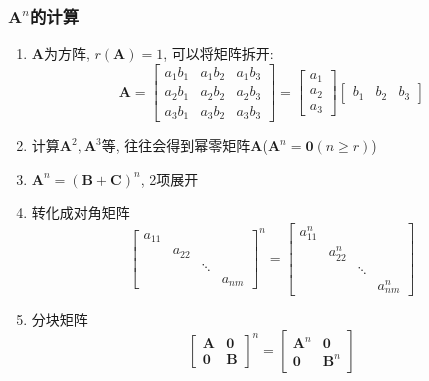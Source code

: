 \subsubsection{$ \bm{A}^{n} $的计算}
\begin{enumerate}
\item $ \bm{A} $为方阵, $ r(\bm{A})=1 $, 可以将矩阵拆开:
\begin{equation*}
\bm{A}=
\begin{bmatrix}
a_{1}b_{1} & a_{1}b_{2} & a_{1}b_{3} \\
a_{2}b_{1} & a_{2}b_{2} & a_{2}b_{3} \\
a_{3}b_{1} & a_{3}b_{2} & a_{3}b_{3}
\end{bmatrix}=
\begin{bmatrix}
a_{1} \\
a_{2} \\
a_{3}
\end{bmatrix}
\begin{bmatrix}
b_{1} & b_{2} & b_{3}
\end{bmatrix}
\end{equation*}
\item 计算$ \bm{A}^{2},\bm{A}^{3} $等, 往往会得到幂零矩阵$ \bm{A} $($ \bm{A}^{n}=\bm{0}(n\ge r) $)
\item $ \bm{A}^{n}=(\bm{B}+\bm{C})^{n}$, 2项展开
\item 转化成对角矩阵
\begin{equation*}
\begin{bmatrix}
a_{11} & & & \\
& a_{22} & & \\
& & \ddots & \\
& & & a_{nm}
\end{bmatrix}^{n}=
\begin{bmatrix}
a_{11}^{n} & & & \\
& a_{22}^{n} & & \\
& & \ddots & \\
& & & a_{nm}^{n}
\end{bmatrix}
\end{equation*}
\item 分块矩阵
\begin{equation*}
\begin{bmatrix}
\bm{A} & \bm{0} \\
\bm{0} & \bm{B}
\end{bmatrix}^{n}=
\begin{bmatrix}
\bm{A}^{n} & \bm{0} \\
\bm{0} & \bm{B}^{n}
\end{bmatrix}
\end{equation*}
\end{enumerate}
